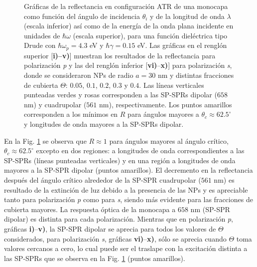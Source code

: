 \begin{figure}[h!]
\vspace*{-.5em}
	\caption{Gráficas de la reflectancia en configuración ATR de una monocapa como función del ángulo de incidencia $\theta_i$ y de la longitud de onda $\lambda$ (escala inferior) así como de la energía de la onda plana incidente en unidades de $\hbar\omega$ (escala superior), para una función dieléctrica tipo Drude con $\hbar\omega_p=4. 3$ eV  y  $\hbar\gamma=0. 15$ eV.  Las gráficas   en el renglón superior [\textbf{i)--v)}]  muestran los resultados de la reflectancia para  polarización \emph{p} y las del renglón inferior  [\textbf{vi)}--\textbf{x)}] para polarización  \emph{s}, donde se consideraron NPs de radio $a=30$ nm y distintas fracciones de cubierta $\Theta$: $0. 05$, $0. 1$, $0. 2$, $0. 3$ y $0. 4$. Las líneas verticales punteadas verdes y rosas corresponden a las SP-SPRs dipolar ($658$ nm) y cuadrupolar ($561$ nm), respectivamente. Los puntos amarillos corresponden a los mínimos en $R$ para ángulos mayores a $\theta_c\approx 62.5^\circ$ y longitudes de onda mayores a la SP-SPRs dipolar.}	\label{fig:R-ATR4}	
	\end{figure}	

En la Fig.  \ref{fig:R-ATR4} se observa que $R\approx 1$ para ángulos mayores al ángulo crítico, $\theta_c \approx 62.5^\circ $ excepto en dos regiones: a longitudes de onda correspondientes a las SP-SPRs (líneas punteadas verticales) y en una región a longitudes de onda mayores a la SP-SPR dipolar (puntos amarillos). El decremento en la reflectancia después del ángulo crítico alrededor de la SP-SPR cuadrupolar ($561$ nm) es resultado de la extinción de luz debido a la presencia de las NPs y es apreciable tanto para polarización \emph{p} como para \emph{s}, siendo más evidente para las fracciones de cubierta mayores. La respuesta óptica de la monocapa a $658$ nm (SP-SPR dipolar) es distinta para cada polarización. Mientras que en polarización \emph{p}, gráficas \textbf{i)}--\textbf{v)}, la SP-SPR dipolar se aprecia para todos los valores de $\Theta$ considerados, para polarización \emph{s}, gráficas \textbf{vi)}--\textbf{x)},  sólo se aprecia cuando $\Theta$ toma valores cercanos a cero, lo cual puede ser el traslape con la excitación distinta a las SP-SPRs que se observa en la Fig. \ref{fig:R-ATR4} (puntos amarillos).

